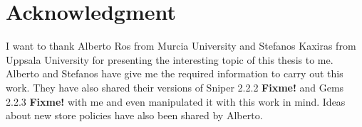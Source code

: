 \chapter*{Acknowledgment}
I want to thank Alberto Ros from Murcia University and Stefanos Kaxiras from
Uppsala University for presenting the interesting topic of this thesis to me. Alberto
and Stefanos have give me the required information to carry out this work. They
have also shared their versions of Sniper 2.2.2 \textbf{Fixme!} and Gems 2.2.3  \textbf{Fixme!} with me and even
manipulated it with this work in mind. Ideas about new store policies have also been
shared by Alberto.
\newpage